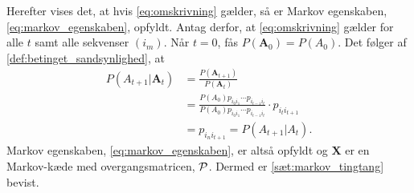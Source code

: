 \begin{bev}
Herefter vises det, at hvis \eqref{eq:omskrivning} gælder, så er Markov egenskaben, \eqref{eq:markov_egenskaben}, opfyldt. Antag derfor, at \eqref{eq:omskrivning} gælder for alle $t$ samt alle sekvenser $(i_m)$. Når $t = 0$, fås $P(\bm A_0)=P(A_0)$. Det følger af \autoref{def:betinget_sandsynlighed}, at
\begin{align*}
    P(A_{t+1}|\bm A_t)&=\frac{P(\bm A_{t+1})}{P(\bm A_t)}\\
    &= \frac{P(A_0)p_{i_0i_1}\cdots p_{i_{t-1}i_t}}{P(A_0)p_{i_0i_1}\cdots p_{i_{t-1}i_t}}\cdot p_{i_{t}i_{t+1}}
    \\
    &=p_{i_ni_{t+1}} = P(A_{t+1} | A_t).
\end{align*}
Markov egenskaben, \eqref{eq:markov_egenskaben}, er altså opfyldt og $\bm X$ er en Markov-kæde med overgangsmatricen, $\P$. Dermed er \autoref{sæt:markov_tingtang} bevist.










\end{bev}


